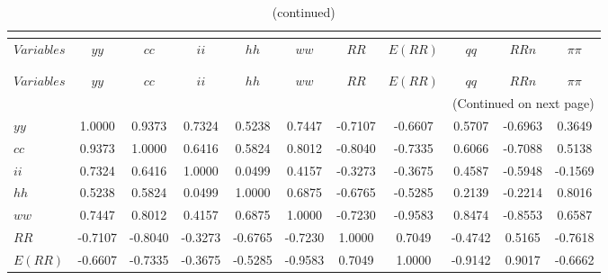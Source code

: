  
\begin{center}
\begin{longtable}{lcccccccccc} 
\caption{MATRIX OF CORRELATIONS}\\
 \label{Table:th_corr_matrix}\\
\toprule 
$Variables  $	 & 	 $         yy$	 & 	 $         cc$	 & 	 $         ii$	 & 	 $         hh$	 & 	 $         ww$	 & 	 $         RR$	 & 	 $      E(RR)$	 & 	 $         qq$	 & 	 $        RRn$	 & 	 $   \pi\pi$\\
\midrule \endfirsthead 
\caption{(continued)}\\
 \toprule \\ 
$Variables  $	 & 	 $         yy$	 & 	 $         cc$	 & 	 $         ii$	 & 	 $         hh$	 & 	 $         ww$	 & 	 $         RR$	 & 	 $      E(RR)$	 & 	 $         qq$	 & 	 $        RRn$	 & 	 $   \pi\pi$\\
\midrule \endhead 
\midrule \multicolumn{11}{r}{(Continued on next page)} \\ \bottomrule \endfoot 
\bottomrule \endlastfoot 
$yy         $	 & 	     1.0000	 & 	     0.9373	 & 	     0.7324	 & 	     0.5238	 & 	     0.7447	 & 	    -0.7107	 & 	    -0.6607	 & 	     0.5707	 & 	    -0.6963	 & 	     0.3649 \\ 
$cc         $	 & 	     0.9373	 & 	     1.0000	 & 	     0.6416	 & 	     0.5824	 & 	     0.8012	 & 	    -0.8040	 & 	    -0.7335	 & 	     0.6066	 & 	    -0.7088	 & 	     0.5138 \\ 
$ii         $	 & 	     0.7324	 & 	     0.6416	 & 	     1.0000	 & 	     0.0499	 & 	     0.4157	 & 	    -0.3273	 & 	    -0.3675	 & 	     0.4587	 & 	    -0.5948	 & 	    -0.1569 \\ 
$hh         $	 & 	     0.5238	 & 	     0.5824	 & 	     0.0499	 & 	     1.0000	 & 	     0.6875	 & 	    -0.6765	 & 	    -0.5285	 & 	     0.2139	 & 	    -0.2214	 & 	     0.8016 \\ 
$ww         $	 & 	     0.7447	 & 	     0.8012	 & 	     0.4157	 & 	     0.6875	 & 	     1.0000	 & 	    -0.7230	 & 	    -0.9583	 & 	     0.8474	 & 	    -0.8553	 & 	     0.6587 \\ 
$RR         $	 & 	    -0.7107	 & 	    -0.8040	 & 	    -0.3273	 & 	    -0.6765	 & 	    -0.7230	 & 	     1.0000	 & 	     0.7049	 & 	    -0.4742	 & 	     0.5165	 & 	    -0.7618 \\ 
$E(RR)      $	 & 	    -0.6607	 & 	    -0.7335	 & 	    -0.3675	 & 	    -0.5285	 & 	    -0.9583	 & 	     0.7049	 & 	     1.0000	 & 	    -0.9142	 & 	     0.9017	 & 	    -0.6662 \\ 

\end{longtable}
\end{center}
